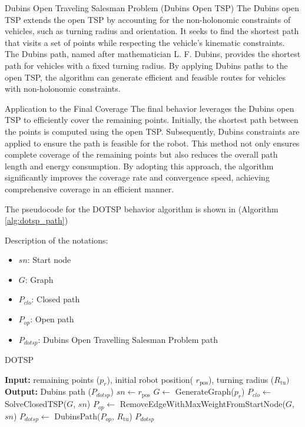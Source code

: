 Dubins Open Traveling Salesman Problem (Dubins Open TSP)
The Dubins open TSP extends the open TSP by accounting for the non-holonomic constraints of vehicles, such as turning radius and orientation. It seeks to find the shortest path that visits a set of points while respecting the vehicle's kinematic constraints. The Dubins path, named after mathematician L. F. Dubins, provides the shortest path for vehicles with a fixed turning radius. By applying Dubins paths to the open TSP, the algorithm can generate efficient and feasible routes for vehicles with non-holonomic constraints.

\vspace*{6mm}   

Application to the Final Coverage
The final behavior leverages the Dubins open TSP to efficiently cover the remaining points. Initially, the shortest path between the points is computed using the open TSP. Subsequently, Dubins constraints are applied to ensure the path is feasible for the robot. This method not only ensures complete coverage of the remaining points but also reduces the overall path length and energy consumption. By adopting this approach, the algorithm significantly improves the coverage rate and convergence speed, achieving comprehensive coverage in an efficient manner.

\vspace*{6mm}   

The pseudocode for the DOTSP behavior algorithm is shown in (Algorithm \autoref{alg:dotsp_path})

Description of the notations:
\begin{multicols}{2}
\begin{itemize}[noitemsep,topsep=0pt]
    \item $sn$: Start node
    \item $G$: Graph
    \item $P_{clo}$: Closed path
    \item $P_{op}$: Open path
    \item $P_{dotsp}$: Dubins Open Travelling Salesman Problem path
\end{itemize}
\end{multicols}

\begin{algorithm}[H]
    \caption{DOTSP}
    \label{alg:dotsp_path}
    \begin{algorithmic}[1]
    \Statex \textbf{Input:} remaining points ($p_r$), initial robot position( $r_{\text{pos}}$), turning radius ($R_{\text{tu}})$
    \Statex \textbf{Output:} Dubins path ($P_{dotsp}$)
    \newline
    \State $sn \leftarrow r_{\text{pos}}$
    \State $G \leftarrow$ GenerateGraph($p_r$)
    \State $P_{clo} \leftarrow$ SolveClosedTSP($G$, $sn$)
    \State $P_{op} \leftarrow$ RemoveEdgeWithMaxWeightFromStartNode($G$, $sn$)
    \State $P_{dotsp} \leftarrow$ DubinsPath($P_{op}$, $R_{\text{tu}}$)
    \State \Return $P_{dotsp}$
    \end{algorithmic}
    \end{algorithm}


